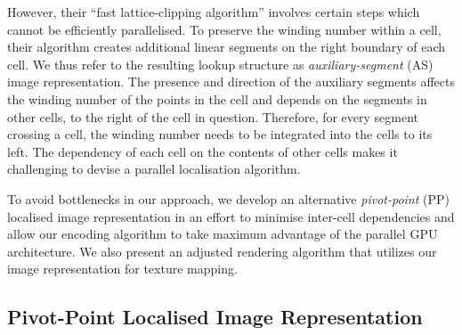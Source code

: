 \documentclass[11pt,a4paper,twoside]{article}
\begin{document}
However, their ``fast lattice-clipping algorithm'' involves certain steps which cannot be efficiently parallelised. To preserve the winding number within a cell, their algorithm creates additional linear segments on the right boundary of each cell. We thus refer to the resulting lookup structure as \emph{auxiliary-segment} (AS) image representation. The presence and direction of the auxiliary segments affects the winding number of the points in the cell and depends on the segments in other cells, to the right of the cell in question. Therefore, for every segment crossing a cell, the winding number needs to be integrated into the cells to its left. The dependency of each cell on the contents of other cells makes it challenging to devise a parallel localisation algorithm.

To avoid bottlenecks in our approach, we develop an alternative \emph{pivot-point} (PP) localised image representation in an effort to minimise inter-cell dependencies and allow our encoding algorithm to take maximum advantage of the parallel GPU architecture. We also present an adjusted rendering algorithm that utilizes our image representation for texture mapping.

\subsection {Pivot-Point Localised Image Representation}
\end{document}

